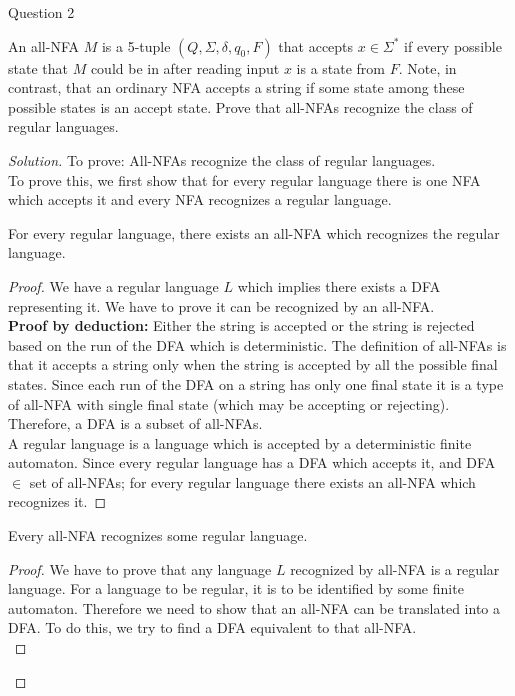 \begin{solution}{Question 2}\label{ques:2}
    \begin{question}
     An all-NFA $M$ is a 5-tuple $(Q,\Sigma,\delta,q_0,F)$ that accepts $x \in \Sigma^*$ if every possible state that $M$ could be in after reading input $x$ is a state from $F$. Note, in contrast, that an ordinary NFA accepts a string if some state among these possible states is an accept state.  Prove that all-NFAs recognize the class of regular languages.
    \end{question}
    \tcblower{}
    \begin{proof}[Solution]
    To prove: All-NFAs recognize the class of regular languages.\\
    To prove this, we first show that for every regular language there is one NFA which accepts it and every NFA recognizes a regular language.
        \begin{claim}
        For every regular language, there exists an all-NFA which recognizes the regular language.
        \end{claim}
        \begin{proof}
            We have a regular language $L$ which implies there exists a DFA representing it. We have to prove it can be recognized by an all-NFA.\\
            \textbf{Proof by deduction: }
            Either the string is accepted or the string is rejected based on the run of the DFA which is deterministic. The definition of all-NFAs is that it accepts a string only when the string is accepted by all the possible final states. Since each run of the DFA on a string has only one final state it is a type of all-NFA with single final state (which may be accepting or rejecting). Therefore, a DFA is a subset of all-NFAs.\\
            A regular language is a language which is accepted by a deterministic finite automaton. Since every regular language has a DFA which accepts it, and DFA $\in $ set of all-NFAs; for every regular language there exists an all-NFA which recognizes it.
        \end{proof}
        \begin{claim}
        Every all-NFA recognizes some regular language.
        \end{claim}
        \begin{proof}
            We have to prove that any language $L$ recognized by all-NFA is a regular language. For a language to be regular, it is to be identified by some finite automaton. Therefore we need to show that an all-NFA can be translated into a DFA. To do this, we try to find a DFA equivalent to that all-NFA.\\

\end{proof}
\end{proof}
\end{solution}

